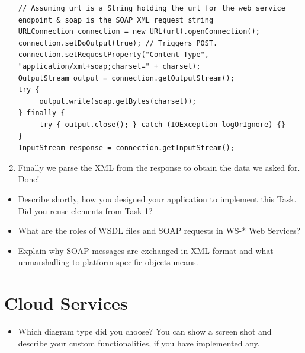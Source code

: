 \documentclass{report}
\begin{document}
\begin{enumerate}
	\begin{lstlisting}
// Assuming url is a String holding the url for the web service endpoint & soap is the SOAP XML request string
URLConnection connection = new URL(url).openConnection();
connection.setDoOutput(true); // Triggers POST.
connection.setRequestProperty("Content-Type", "application/xml+soap;charset=" + charset);
OutputStream output = connection.getOutputStream();
try {
     output.write(soap.getBytes(charset));
} finally {
     try { output.close(); } catch (IOException logOrIgnore) {}
}
InputStream response = connection.getInputStream();
	\end{lstlisting}
	\item Finally we parse the XML from the response to obtain the data we asked for. Done!
\end{enumerate}

\begin{itemize}
	\item Describe shortly, how you designed your application to implement this Task. Did you reuse elements from Task 1?
	\item What are the roles of WSDL files and SOAP requests in WS-* Web Services?
	\item Explain why SOAP messages are exchanged in XML format and what unmarshalling to platform specific objects means.
\end{itemize}

\section{Cloud Services}
\begin{itemize}
	\item Which diagram type did you choose? You can show a screen shot and describe your custom functionalities, if you have implemented any.
\end{itemize}
\end{document}
